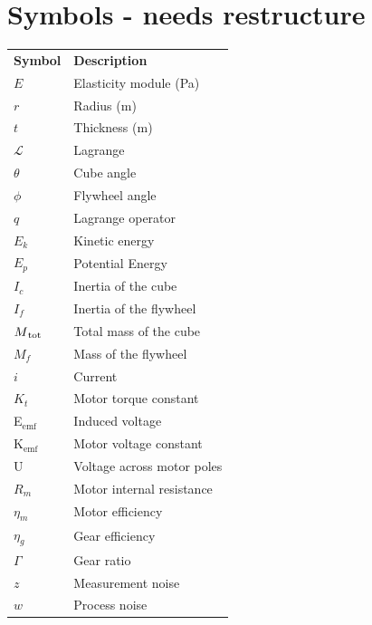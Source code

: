 \documentclass[a4paper,11pt]{kth-mag}
\newcommand{\textunderscript}[1]{$_{\text{#1}}$}
\begin{document}
\section*{Symbols - needs restructure}
\noindent{}\begin{tabular}{@{}p{2.5cm}l}
\textbf{Symbol} 	& \textbf{Description} \vspace{.5em} \\
$E$ 		& Elasticity module (Pa) \\
$r$		& Radius (m) \\
$t$		& Thickness (m) \\
$\mathcal{L}$			& Lagrange \\
$\theta$		& Cube angle\\
$\phi$		& Flywheel angle \\
$q$			& Lagrange operator \\
$E_k	$		& Kinetic energy \\
$E_p$		& Potential Energy \\
$I_c$		& Inertia of the cube\\
$I_f$		& Inertia of the flywheel\\
$M\textsubscript{tot}$		& Total mass of the cube\\
$M_f$		& Mass of the flywheel \\
$i$			& Current\\
$K_t$		& Motor torque constant\\
E\textunderscript{emf} 	& Induced voltage \\
K\textunderscript{emf} 	& Motor voltage constant \\
U			& Voltage across motor poles\\
$R_m	$		& Motor internal resistance \\
$\eta_m$		& Motor efficiency\\	
$\eta_g$		& Gear efficiency \\
$\Gamma$		& Gear ratio\\
$z$			& Measurement noise \\
$w$			& Process noise \\

\end{tabular}
\clearpage
\end{document}
